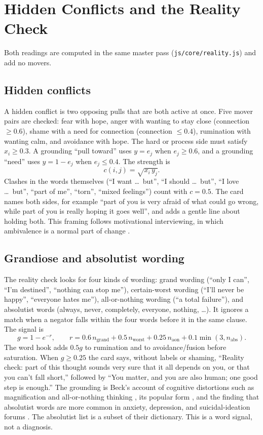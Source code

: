 \documentclass[10pt]{article}
\theoremstyle{definition}
\theoremstyle{remark}
\begin{document}
\section{Hidden Conflicts and the Reality Check}
\label{sec:reality}
Both readings are computed in the same master pass (\texttt{js/core/reality.js}) and add no movers.

\subsection{Hidden conflicts}
A hidden conflict is two opposing pulls that are both active at once. Five mover pairs are checked: fear with hope, anger with wanting to stay close (connection $\ge0.6$), shame with a need for connection (connection $\le0.4$), rumination with wanting calm, and avoidance with hope. The hard or process side must satisfy $x_i\ge0.3$. A grounding ``pull toward'' uses $y=e_j$ when $e_j\ge0.6$, and a grounding ``need'' uses $y=1-e_j$ when $e_j\le0.4$. The strength is
\begin{equation}
c(i,j) = \sqrt{x_i\,y_j}.
\end{equation}
Clashes in the words themselves (``I want \dots\ but'', ``I should \dots\ but'', ``I love \dots\ but'', ``part of me'', ``torn'', ``mixed feelings'') count with $c=0.5$. The card names both sides, for example ``part of you is very afraid of what could go wrong, while part of you is really hoping it goes well'', and adds a gentle line about holding both. This framing follows motivational interviewing, in which ambivalence is a normal part of change \citep{miller2013}.

\subsection{Grandiose and absolutist wording}
The reality check looks for four kinds of wording: grand wording (``only I can'', ``I'm destined'', ``nothing can stop me''), certain-worst wording (``I'll never be happy'', ``everyone hates me''), all-or-nothing wording (``a total failure''), and absolutist words (always, never, completely, everyone, nothing, \dots). It ignores a match when a negator falls within the four words before it in the same clause. The signal is
\begin{equation}
g = 1 - e^{-r},\qquad r = 0.6\,n_{\mathrm{grand}} + 0.5\,n_{\mathrm{worst}} + 0.25\,n_{\mathrm{aon}} + 0.1\min(3, n_{\mathrm{abs}}).
\end{equation}
The word hook adds $0.5g$ to rumination and to avoidance/fusion before saturation. When $g\ge0.25$ the card says, without labels or shaming, ``Reality check: part of this thought sounds very sure that it all depends on you, or that you can't fall short,'' followed by ``You matter, and you are also human; one good step is enough.'' The grounding is Beck's account of cognitive distortions such as magnification and all-or-nothing thinking \citep{beck1976}, its popular form \citep{burns1980}, and the finding that absolutist words are more common in anxiety, depression, and suicidal-ideation forums \citep{almosaiwi2018}. The absolutist list is a subset of their dictionary. This is a word signal, not a diagnosis.
\end{document}
